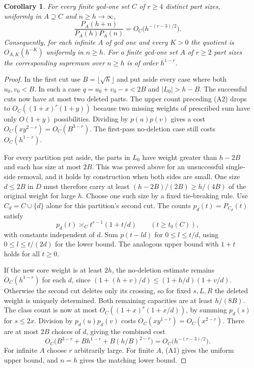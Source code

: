 \documentclass[11pt,a4paper]{article}
\newtheorem{corollary}[theorem]{Corollary}
\numberwithin{equation}{section}
\begin{document}
\begin{corollary}\label{th:arbitrary-rate}
For every finite gcd-one set $C$ of $r\ge4$ distinct part sizes,
uniformly in $A\supseteq C$ and $n\ge h\to\infty$,
\[
 \frac{P_A(h+n)}{P_A(h)P_A(n)}=O_C\bigl(h^{-(r-3)/2}\bigr).
\]
Consequently, for each infinite $A$ of gcd one and every $K>0$
the quotient is $O_{A,K}(h^{-K})$ uniformly in $n\ge h$. For
a finite gcd-one set $A$ of $r\ge2$ part sizes the corresponding
supremum over $n\ge h$ is of order $h^{1-r}$.
\end{corollary}
\begin{proof}
In the first cut use $B=\lfloor\sqrt h\rfloor$ and put aside every
case where both $u_0,v_0<B$. In such a case
$q=u_0+v_0-s<2B$ and $|L_0|>h-B$. The successful cuts now have
at most two deleted parts. The upper count preceding (A2) drops to
$O_C((1+x)^r(1+y))$ because two missing weights of prescribed sum
have only $O(1+y)$ possibilities. Dividing by $p(u)p(v)$ gives a
cost $O_C(xy^{2-r})=O_C(B^{3-r})$. The first-pass no-deletion
case still costs $O_C(h^{1-r})$.

For every partition put aside, the parts in $L_0$ have weight greater
than $h-2B$ and each has size at most $2B$. This was proved above
for an unsuccessful single-side removal, and it holds by construction
when both sides are small. One size $d\le2B$ in $D$ must therefore
carry at least $(h-2B)/(2B)\ge h/(4B)$ of the original weight for
large $h$. Choose one such size by a fixed tie-breaking rule.
Use $C_d=C\cup\{d\}$ alone for this partition's second cut.
The counts $p_d(t)=P_{C_d}(t)$ satisfy
\[
 p_d(t)\asymp_C t^{r-1}(1+t/d)\qquad(t\ge t_0(C)),
\]
with constants independent of $d$. Sum $p(t-ld)$ for
$0\le l\le t/d$, using $0\le l\le t/(2d)$ for the lower bound.
The analogous upper bound with $1+t$ holds for all $t\ge0$.

If the new core weight is at least $2h$, the no-deletion estimate
remains $O_C(h^{1-r})$ for each $d$, since
$(1+(h+v)/d)\le(1+h/d)(1+v/d)$.
Otherwise the second cut deletes only its crossing, so for fixed
$s,L,R$ the deleted weight is uniquely determined. Both remaining
capacities are at least $h/(8B)$. The class count is now at most
$O_C((1+x)^r(1+x/d))$, by summing $p_d(s)$ for $s\le 2x$.
Division by $p_d(u)p_d(v)$ costs $O_C(xy^{1-r})=O_C(x^{2-r})$.
There are at most $2B$ choices of $d$, giving the combined cost
\[
 O_C\bigl(B^{3-r}+Bh^{1-r}+B(h/B)^{2-r}\bigr)
 =O_C\bigl(h^{-(r-3)/2}\bigr).
\]
For infinite $A$ choose $r$ arbitrarily large. For finite $A$,
(A1) gives the uniform upper bound, and $n=h$ gives the matching
lower bound.
\end{proof}
\end{document}
